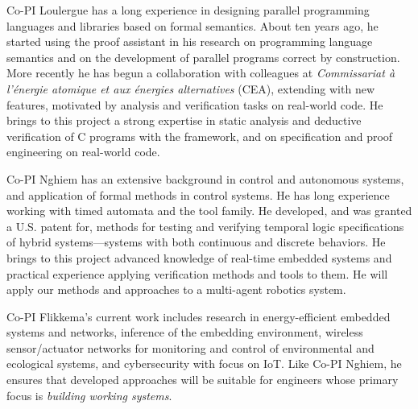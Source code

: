 Co-PI Loulergue has a long experience in designing parallel programming languages and libraries based on formal semantics. About ten years ago, he started using the \Coq proof assistant in his research on programming language semantics and on the development of parallel programs correct by construction. More recently he has begun a collaboration with colleagues at {\it Commissariat \`a l'\'energie atomique et aux \'energies alternatives} (CEA), extending \framac with new features, motivated by analysis and verification tasks on real-world code. He brings to this project a strong expertise in static analysis and deductive verification of C programs with the \framac framework, and on specification and proof engineering on real-world code. 

Co-PI Nghiem has an extensive background in control and autonomous systems, and application of formal methods in control systems.
He has long experience working with timed automata and the \uppaal tool family.
He developed, and was granted a U.S. patent for, methods for testing and verifying temporal logic specifications of hybrid systems---systems with both continuous and discrete behaviors.
He brings to this project advanced knowledge of real-time embedded systems and practical experience applying verification methods and tools to them.
He will
apply our methods and approaches to a multi-agent robotics system.

Co-PI Flikkema's current work includes research in energy-efficient embedded systems and networks, inference of the embedding environment, wireless sensor/actuator networks for monitoring and control of environmental and ecological systems, and cybersecurity with focus on IoT.  Like Co-PI Nghiem, he ensures that developed approaches will be suitable for engineers whose primary focus is \emph{building working systems}.